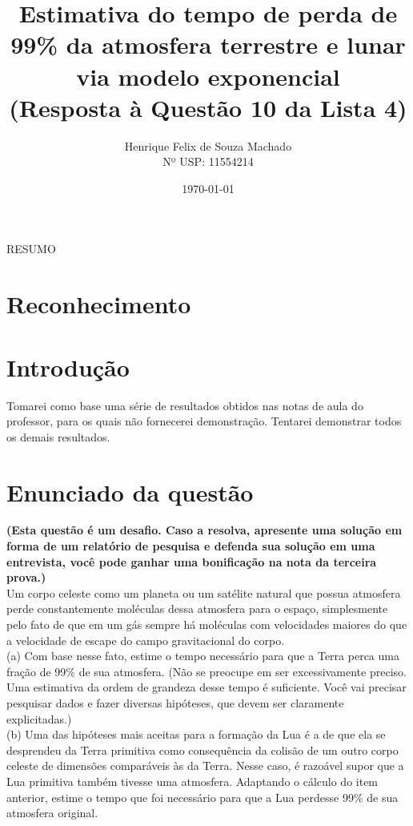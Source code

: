 \documentclass[12pt]{extarticle} %
\title{
    Estimativa do tempo de perda de 99\% da atmosfera terrestre e lunar via modelo exponencial\\
    \vspace{2mm}
    \large
    (Resposta à Questão 10 da Lista 4)
}
\author{
    Henrique Felix de Souza Machado\\
    Nº USP: 11554214
}
\date{\today}
\begin{document}
\maketitle
\thispagestyle{firstpage}
\pagestyle{otherpages}


RESUMO





\section{Reconhecimento}





\section{Introdução}

Tomarei como base uma série de resultados obtidos nas notas de aula do professor, para os quais não fornecerei demonstração. Tentarei demonstrar todos os demais resultados.






\section{Enunciado da questão}

\begin{itshape}
\textbf{(Esta questão é um desafio. Caso a resolva, apresente uma solução em
forma de um relatório de pesquisa e defenda sua solução em uma entrevista, você pode ganhar uma bonificação na nota da terceira prova.)}
\\Um corpo celeste como um planeta ou um satélite natural que possua atmosfera perde constantemente moléculas dessa atmosfera para o espaço, simplesmente pelo fato de que em um gás sempre há moléculas com velocidades maiores do que a velocidade de escape do campo gravitacional do corpo.
\\(a) Com base nesse fato, estime o tempo necessário para que a Terra perca uma fração de 99\% de sua atmosfera. (Não se preocupe em ser excessivamente preciso. Uma estimativa da ordem de grandeza desse tempo é suficiente. Você vai precisar pesquisar dados e fazer diversas hipóteses, que devem ser claramente explicitadas.)
\\(b) Uma das hipóteses mais aceitas para a formação da Lua é a de que ela se desprendeu da Terra primitiva como consequência da colisão de um outro corpo celeste de dimensões comparáveis às da Terra. Nesse caso, é razoável supor que a Lua primitiva também tivesse uma atmosfera. Adaptando o cálculo do item anterior, estime o tempo que foi necessário para que a Lua perdesse 99\% de sua atmosfera original.
\end{itshape}
\end{document}
